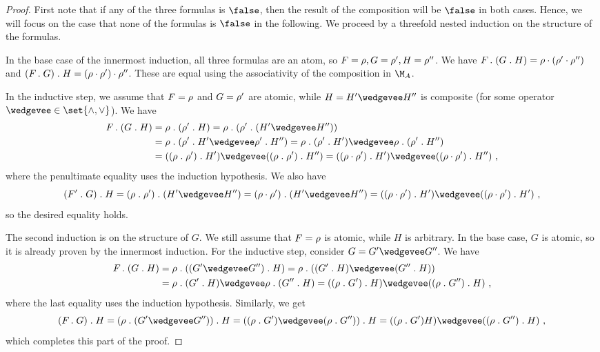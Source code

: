 \documentclass[../../diss.tex]{subfiles}
\begin{document}
\begin{proof}
    First note that if any of the three formulas is $\false$, then the result of the composition will be $\false$ in both cases.
    Hence, we will focus on the case that none of the formulas is $\false$ in the following.
    We proceed by a threefold nested induction on the structure of the formulas.

    In the base case of the innermost induction, all three formulas are an atom, so $F = \tbox, G = \tbox', H = \tbox''$.
    We have $F \comp (G \comp H) = \tbox \relcomp (\tbox' \relcomp \tbox'')$ and $(F \comp G) \comp H = (\tbox \relcomp \tbox') \relcomp \tbox''$.
    These are equal using the associativity of the composition in $\nfatransmonoid{A}$.

    In the inductive step, we assume that $F = \tbox$ and $G = \tbox'$ are atomic, while $H = H' \wedgevee H''$ is composite (for some operator ${\wedgevee} \in \set{\wedge,\vee}$).
    We have
    \begin{align*}
        F \comp (G \comp H)
        &= \tbox \comp (\tbox' \comp H)
        = \tbox \comp (\tbox' \comp (H' \wedgevee H''))
        \\
        &= \tbox \comp (\tbox' \comp H' \wedgevee \tbox' \comp H'')
        = \tbox \comp (\tbox' \comp H') \wedgevee \tbox \comp (\tbox' \comp H'')
        \\
        &= ((\tbox \comp \tbox') \comp H') \wedgevee ((\tbox \comp \tbox') \comp H'')
        = ((\tbox \relcomp \tbox') \comp H') \wedgevee ((\tbox \relcomp \tbox') \comp H'')
        \ ,
    \end{align*}
    where the penultimate equality uses the induction hypothesis.
    We also have
    \[
        (F' \comp G) \comp H
        = (\tbox \comp \tbox') \comp (H' \wedgevee H'')
        = (\tbox \relcomp \tbox') \comp (H' \wedgevee H'')
        = ((\tbox \relcomp \tbox') \comp H') \wedgevee ((\tbox \relcomp \tbox') \comp H')
        \ ,
    \]
    so the desired equality holds.

    The second induction is on the structure of $G$.
    We still assume that $F = \tbox$ is atomic, while $H$ is arbitrary.
    In the base case, $G$ is atomic, so it is already proven by the innermost induction.
    For the inductive step, consider $G = G' \wedgevee G''$.
    We have
    \begin{align*}
        F \comp (G \comp H)
        &= \tbox \comp ( (G' \wedgevee G'') \comp H)
        = \tbox \comp ( (G' \comp H) \wedgevee (G'' \comp H))
        \\
        &= \tbox \comp (G' \comp H) \wedgevee \tbox \comp (G'' \comp H)
        = ((\tbox \comp G') \comp H) \wedgevee ((\tbox \comp G'') \comp H)
        \ ,
    \end{align*}
    where the last equality uses the induction hypothesis.
    Similarly, we get
    \[
        (F \comp G) \comp H
        = (\tbox \comp (G' \wedgevee G'')) \comp H
        = ((\tbox \comp G') \wedgevee (\tbox \comp G'')) \comp H
        = ((\tbox \comp G') H) \wedgevee ((\tbox \comp G'') \comp H)
        \ ,
    \]
    which completes this part of the proof.


\end{proof}
\end{document}
